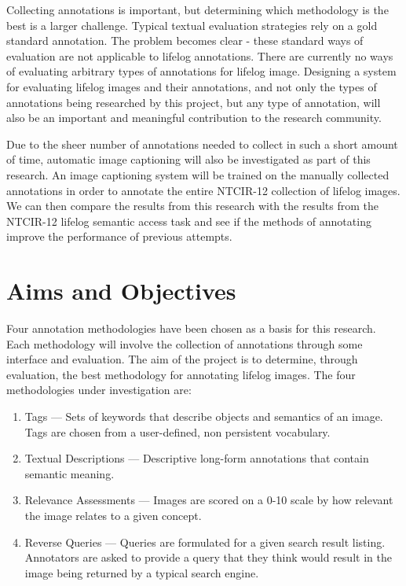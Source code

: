 Collecting annotations is important, but determining which methodology is the best is a larger challenge. Typical textual evaluation strategies rely on a gold standard annotation. The problem becomes clear - these standard ways of evaluation are not applicable to lifelog annotations. There are currently no ways of evaluating arbitrary types of annotations for lifelog image. Designing a system for evaluating lifelog images and their annotations, and not only the types of annotations being researched by this project, but any type of annotation, will also be an important and meaningful contribution to the research community. 

Due to the sheer number of annotations needed to collect in such a short amount of time, automatic image captioning will also be investigated as part of this research. An image captioning system will be trained on the manually collected annotations in order to annotate the entire NTCIR-12 collection of lifelog images. We can then compare the results from this research with the results from the NTCIR-12 lifelog semantic access task and see if the methods of annotating improve the performance of previous attempts.

\section{Aims and Objectives}

Four annotation methodologies have been chosen as a basis for this research. Each methodology will involve the collection of annotations through some interface and evaluation. The aim of the project is to determine, through evaluation, the best methodology for annotating lifelog images. The four methodologies under investigation are: 

\begin{enumerate}
    \item Tags --- Sets of keywords that describe objects and semantics of an image. Tags are chosen from a user-defined, non persistent vocabulary.
    \item Textual Descriptions --- Descriptive long-form annotations that contain semantic meaning.
    \item Relevance Assessments --- Images are scored on a 0-10 scale by how relevant the image relates to a given concept.
    \item Reverse Queries --- Queries are formulated for a given search result listing. Annotators are asked to provide a query that they think would result in the image being returned by a typical search engine.
\end{enumerate}

